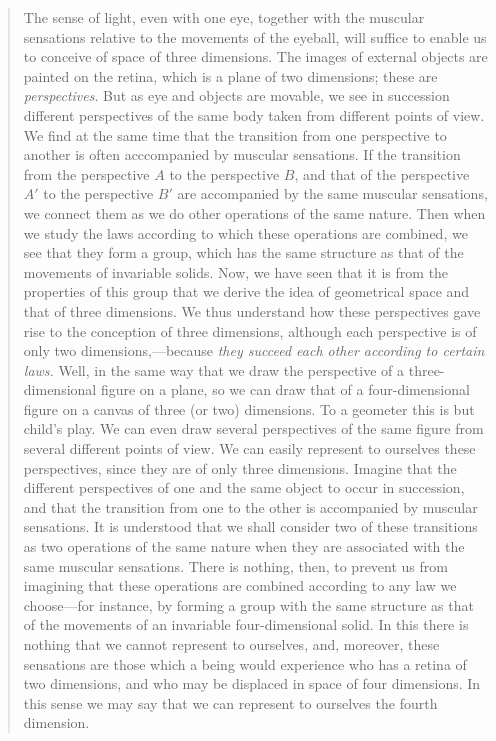 \documentclass{article}
\begin{document}
\begin{quote}
    The sense of light, even with one eye, together with the muscular sensations relative to the movements of the eyeball, will suffice to enable us to conceive of space of three dimensions.  The images of external objects are painted on the retina, which is a plane of two dimensions; these are \emph{perspectives}.  But as eye and objects are movable, we see in succession different perspectives of the same body taken from different points of view.  We find at the same time that the transition from one perspective to another is often acccompanied by muscular sensations.  If the transition from the perspective $A$ to the perspective $B$, and that of the perspective $A'$ to the perspective $B'$ are accompanied by the same muscular sensations, we connect them as we do other operations of the same nature.  Then when we study the laws according to which these operations are combined, we see that they form a group, which has the same structure as that of the movements of invariable solids.  Now, we have seen that it is from the properties of this group that we derive the idea of geometrical space and that of three dimensions.  We thus understand how these perspectives gave rise to the conception of three dimensions, although each perspective is of only two dimensions,---because \emph{they succeed each other according to certain laws.}  Well, in the same way that we draw the perspective of a three-dimensional figure on a plane, so we can draw that of a four-dimensional figure on a canvas of three (or two) dimensions.  To a geometer this is but child's play.  We can even draw several perspectives of the same figure from several different points of view.  We can easily represent to ourselves these perspectives, since they are of only three dimensions.  Imagine that the different perspectives of one and the same object to occur in succession, and that the transition from one to the other is accompanied by muscular sensations.  It is understood that we shall consider two of these transitions as two operations of the same nature when they are associated with the same muscular sensations.  There is nothing, then, to prevent us from imagining that these operations are combined according to any law we choose---for instance, by forming a group with the same structure as that of the movements of an invariable four-dimensional solid.  In this there is nothing that we cannot represent to ourselves, and, moreover, these sensations are those which a being would experience who has a retina of two dimensions, and who may be displaced in space of four dimensions.  In this sense we may say that we can represent to ourselves the fourth dimension.  
    
    \citep[p. 68-70]{Poincare1952}
\end{quote}
\end{document}
